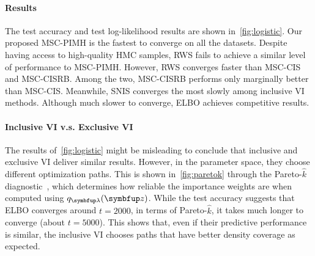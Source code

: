 %
%
\paragraph{Results}
The test accuracy and test log-likelihood results are shown in~\cref{fig:logistic}.
Our proposed MSC-PIMH is the fastest to converge on all the datasets.
Despite having access to high-quality HMC samples, RWS fails to achieve a similar level of performance to MSC-PIMH.
However, RWS converges faster than MSC-CIS and MSC-CISRB.
Among the two, MSC-CISRB performs only marginally better than MSC-CIS.
Meanwhile, SNIS converges the most slowly among inclusive VI methods.
Although much slower to converge, ELBO achieves competitive results.

\paragraph{Inclusive VI v.s. Exclusive VI}
The results of~\cref{fig:logistic} might be misleading to conclude that inclusive and exclusive VI deliver similar results.
However, in the parameter space, they choose different optimization paths.
This is shown in~\cref{fig:paretok} through the Pareto-\(\widehat{k}\) diagnostic~\citep{NEURIPS2020_7cac11e2, vehtari_pareto_2021}, which determines how reliable the importance weights are when computed using \(q_{\vlambda}(\vz)\).
While the test accuracy suggests that ELBO converges around \(t=2000\), in terms of Pareto-\(\widehat{k}\), it takes much longer to converge (about \(t=5000\)).
This shows that, even if their predictive performance is similar, the inclusive VI chooses paths that have better density coverage as expected.

